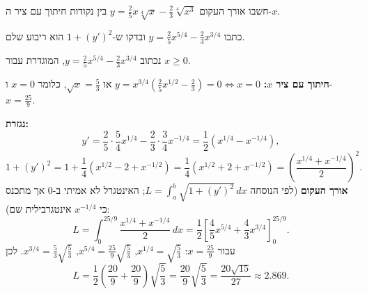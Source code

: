 
\begin{question}
חשבו אורך העקום $y=\frac25x\sqrt[4]{x}-\frac23\sqrt[4]{x^3}$ בין נקודות חיתוך עם ציר ה-$x$.
\end{question}

\begin{hint}
כתבו $y=\frac25x^{5/4}-\frac23x^{3/4}$ ובדקו ש-$1+(y')^2$ הוא ריבוע שלם.
\end{hint}

\begin{solution}
נכתוב $y=\frac25x^{5/4}-\frac23x^{3/4}$, המוגדרת עבור $x\ge0$.

\textbf{חיתוך עם ציר $x$:} $y=x^{3/4}\left(\frac25x^{1/2}-\frac23\right)=0\iff x=0$ או $\sqrt{x}=\frac53$, כלומר $x=0$ ו-$x=\frac{25}{9}$.

\textbf{נגזרת:}
\[
y'=\frac25\cdot\frac54x^{1/4}-\frac23\cdot\frac34x^{-1/4}=\frac12\left(x^{1/4}-x^{-1/4}\right),
\]
\[
1+(y')^2=1+\frac14\left(x^{1/2}-2+x^{-1/2}\right)=\frac14\left(x^{1/2}+2+x^{-1/2}\right)=\left(\frac{x^{1/4}+x^{-1/4}}{2}\right)^2.
\]
\textbf{אורך העקום} (לפי הנוסחה $L=\int_a^b\sqrt{1+(y')^2}\,dx$; האינטגרל לא אמיתי ב-$0$ אך מתכנס כי $x^{-1/4}$ אינטגרבילית שם):
\[
L=\int_0^{25/9}\frac{x^{1/4}+x^{-1/4}}{2}\,dx=\frac12\left[\frac45x^{5/4}+\frac43x^{3/4}\right]_0^{25/9}.
\]
עבור $x=\frac{25}{9}$: $x^{1/4}=\sqrt{\frac53}$, $x^{5/4}=\frac{25}{9}\sqrt{\frac53}$, $x^{3/4}=\frac53\sqrt{\frac53}$. לכן
\[
L=\frac12\left(\frac{20}{9}+\frac{20}{9}\right)\sqrt{\frac53}=\frac{20}{9}\sqrt{\frac53}=\frac{20\sqrt{15}}{27}\approx2.869.
\]
\end{solution}
